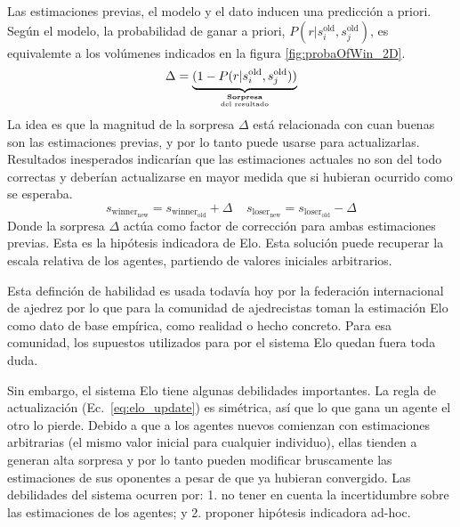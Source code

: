 \documentclass[a4paper,10pt]{book}
\begin{document}
Las estimaciones previas, el modelo y el dato inducen una predicción a priori.
Según el modelo, la probabilidad de ganar a priori, $P(r|s_i^{\text{old}},s_j^{\text{old}})$, es equivalemte a los volúmenes indicados en la figura \ref{fig:probaOfWin_2D}.
\begin{equation*}
 \Delta = \underbrace{(1 - P(r|s_i^{\text{old}},s_j^{\text{old}}))}_{\hfrac{\textbf{Sorpresa}}{\text{del resultado}}}
\end{equation*}
La idea es que la magnitud de la sorpresa $\Delta$ est\'a relacionada con cuan buenas son las estimaciones previas, y por lo tanto puede usarse para actualizarlas.
Resultados inesperados indicar\'ian que las estimaciones actuales no son del todo correctas y deber\'ian actualizarse en mayor medida que si hubieran ocurrido como se esperaba.
\begin{equation}\label{eq:elo_update}
 s_{\text{winner}_\text{new}} = s_{\text{winner}_\text{old}} + \Delta \ \ \ \ \ s_{\text{loser}_\text{new}} = s_{\text{loser}_\text{old}} - \Delta 
\end{equation}
Donde la sorpresa $\Delta$ act\'ua como factor de correcci\'on para ambas estimaciones previas.
Esta es la hipótesis indicadora de Elo.
Esta soluci\'on puede recuperar la escala relativa de los agentes, partiendo de valores iniciales arbitrarios.

\begin{center}
\end{center}

Esta definción de habilidad es usada todavía hoy por la federación internacional de ajedrez por lo que para la comunidad de ajedrecistas toman la estimación Elo como dato de base empírica, como realidad o hecho concreto.
Para esa comunidad, los supuestos utilizados para por el sistema Elo quedan fuera toda duda.


Sin embargo, el sistema Elo tiene algunas debilidades importantes. 
La regla de actualizaci\'on (Ec.~\eqref{eq:elo_update}) es sim\'etrica, as\'i que lo que gana un agente el otro lo pierde.
Debido a que a los agentes nuevos comienzan con estimaciones arbitrarias (el mismo valor inicial para cualquier individuo), ellas tienden a generan alta sorpresa y por lo tanto pueden modificar bruscamente las estimaciones de sus oponentes a pesar de que ya hubieran convergido.
Las debilidades del sistema ocurren por: 1. no tener en cuenta la incertidumbre sobre las estimaciones de los agentes; y 2. proponer hipótesis indicadora ad-hoc.
\end{document}
